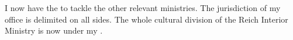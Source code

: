 I now have the  to tackle the other relevant ministries. The jurisdiction of my office is delimited on all sides. The whole cultural division of the Reich Interior Ministry is now under my . 